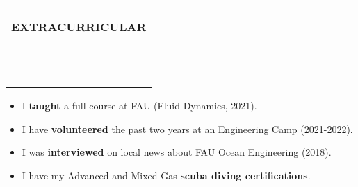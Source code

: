 \documentclass[10pt,A4]{article}
\newcommand{\mpwidth}{\linewidth-\fboxsep-\fboxsep}
\newcommand{\cvtext}[1] {
	\begin{tabular*}{1\mpwidth}{p{0.98\mpwidth}}
		\parbox{1\mpwidth}{#1}
	\end{tabular*}
}
\newcommand{\cvsection}[1] {
	\vspace{14pt}
	\cvtext{
		\textbf{\LARGE{\textcolor{darkcol}{\uppercase{#1}}}}\\[-4pt]
		\textcolor{maincol}{ \rule{0.1\textwidth}{2pt} } \\
	}
}
\begin{document}
\begin{paracol}{2}
\begin{rightcolumn}
\vfill\null
\cvsection{EXTRACURRICULAR}
\vspace{-0.3cm}
\begin{itemize}
  \item I \textbf{taught} a full course at FAU (Fluid Dynamics, 2021).
  \item I have \textbf{volunteered} the past two years at an Engineering Camp (2021-2022).
  \item I was \textbf{interviewed} on local news about FAU Ocean Engineering (2018).
  \item I have my Advanced and Mixed Gas \textbf{scuba diving certifications}.
\end{itemize}
\vfill\null


\vfill
\vfill
\vfill
\end{rightcolumn}
\end{paracol}
\end{document}
